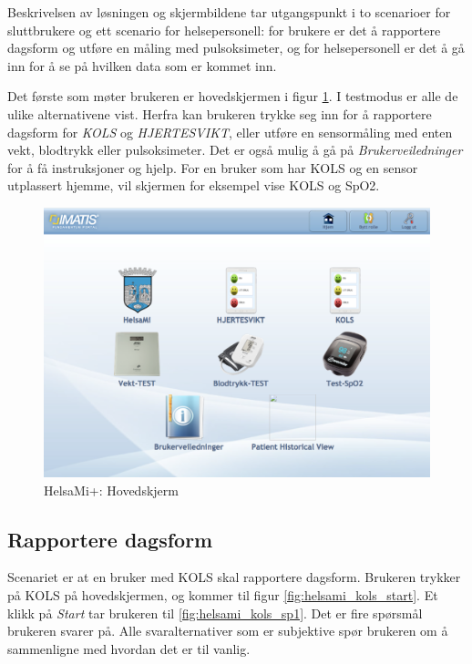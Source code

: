 Beskrivelsen av løsningen og skjermbildene tar utgangspunkt i to scenarioer for sluttbrukere
og ett scenario for helsepersonell: for brukere er det å rapportere dagsform og utføre en måling med pulsoksimeter,
og for helsepersonell er det å gå inn for å se på hvilken data som er kommet inn.

Det første som møter brukeren er hovedskjermen i figur \ref{fig:helsami_hovedskjerm}. I testmodus er alle de ulike
alternativene vist.
Herfra kan brukeren trykke seg inn for å rapportere dagsform for \textit{KOLS} og \textit{HJERTESVIKT}, eller utføre en sensormåling med
enten vekt, blodtrykk eller pulsoksimeter. Det er også mulig å gå på \textit{Brukerveiledninger} for å få instruksjoner og hjelp.
For en bruker som har KOLS og en sensor utplassert hjemme, vil skjermen for eksempel vise KOLS og SpO2.

\begin{figure}
\includegraphics[width=1.0\textwidth,center]{fig/helsami/hovedskjerm}
\caption{HelsaMi+: Hovedskjerm}
\label{fig:helsami_hovedskjerm}
\end{figure}

\subsection{Rapportere dagsform}
Scenariet er at en bruker med KOLS skal rapportere dagsform. Brukeren trykker på KOLS på hovedskjermen,
og kommer til figur \ref{fig:helsami_kols_start}. Et klikk på \textit{Start} tar brukeren til \ref{fig:helsami_kols_sp1}.
Det er fire spørsmål brukeren svarer på. Alle svaralternativer som er subjektive spør brukeren om å sammenligne med
hvordan det er til vanlig.

